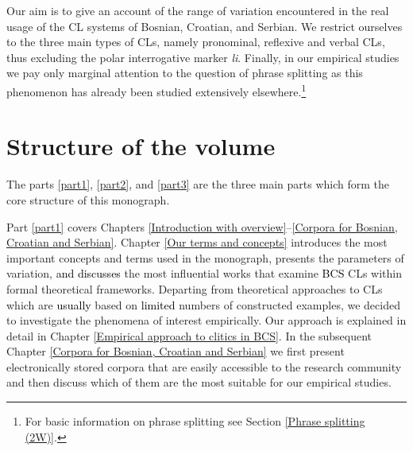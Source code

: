 Our aim is to give an account of the range of variation encountered in the real usage of the CL systems of Bosnian, Croatian, and Serbian. We restrict ourselves to the three main types of CLs, namely pronominal, reflexive and verbal CLs, thus excluding  the polar interrogative marker \textit{li}. Finally, in our empirical studies we pay only marginal attention to the question of phrase splitting as this phenomenon has already been studied extensively elsewhere.\footnote{For basic information on phrase splitting see Section \ref{Phrase splitting (2W)}.}

\section{Structure of the volume}

The parts \ref{part1},  \ref{part2}, and  \ref{part3} are the three main parts which form the core structure of this monograph.
 
Part \ref{part1} covers Chapters \ref{Introduction with overview}--\ref{Corpora for Bosnian, Croatian and Serbian}. Chapter \ref{Our terms and concepts} introduces the most important concepts and terms used in the monograph, presents the parameters of variation, \textcolor{black}{and discusses} the most influential works that examine \textcolor{black}{BCS} CLs within formal theoretical frameworks. Departing from theoretical approaches to CLs which are \textcolor{black}{usually} based on \textcolor{black}{limited} numbers of constructed examples, we decided to investigate the phenomena of interest empirically. Our approach is explained in detail in Chapter \ref{Empirical approach to clitics in BCS}. In the subsequent Chapter \ref{Corpora for Bosnian, Croatian and Serbian} we first present electronically stored corpora that are easily accessible to the research community and then discuss which of them are the most suitable for our empirical studies. 

